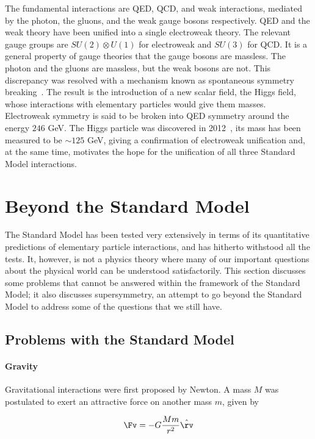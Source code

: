 The fundamental interactions are QED, QCD, and weak interactions, mediated by
the photon, the gluons, and the weak gauge bosons respectively. QED and the
weak theory have been unified into a single electroweak theory. The relevant
gauge groups are $SU(2) \otimes U(1)$ for electroweak and $SU(3)$ for QCD. It
is a general property of gauge theories that the gauge bosons are massless. The
photon and the gluons are massless, but the weak bosons are not. This
discrepancy was resolved with a mechanism known as spontaneous symmetry
breaking~\cite{higgsssb, higgsssb1, higgsssb2}. The result is the introduction
of a new scalar field, the Higgs field, whose interactions with elementary
particles would give them masses. Electroweak symmetry is said to be broken
into QED symmetry around the energy $246$ GeV. The Higgs particle was
discovered in 2012~\cite{higgsdis01, higgsdis02}, its mass has been measured to
be $\sim 125$ GeV, giving a confirmation of electroweak unification and, at the
same time, motivates the hope for the unification of all three Standard Model
interactions.

\section{Beyond the Standard Model}\label{s:smsusy}

The Standard Model has been tested very extensively in terms of its
quantitative predictions of elementary particle interactions, and has hitherto
withstood all the tests. It, however, is not a physics theory where many of our
important questions about the physical world can be understood satisfactorily.
This section discusses some problems that cannot be answered within the
framework of the Standard Model; it also discusses supersymmetry, an attempt to
go beyond the Standard Model to address some of the questions that we still
have.

\subsection{Problems with the Standard Model}\label{smproblems}

\paragraph{Gravity} Gravitational interactions were first proposed by Newton. A
mass $M$ was postulated to exert an attractive force on another mass $m$, given
by

$$ \Fv = -G \frac{Mm}{r^2}\hat{\rv} $$

